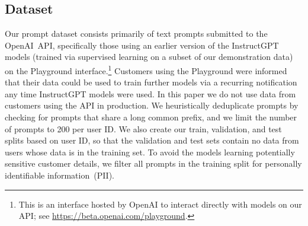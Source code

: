 \documentclass{article}
\begin{document}
\begin{table}
{\begin{tabular}{p{} p{}}
 \bottomrule
 \end{tabular}
}
\end{table}





\subsection{Dataset}
\label{sec:dataset}

Our prompt dataset consists primarily of text prompts submitted to the OpenAI~API, specifically those using an earlier version of the InstructGPT models (trained via supervised learning on a subset of our demonstration data) on the Playground interface.\footnote{This is an interface hosted by OpenAI to interact directly with models on our API; see \url{https://beta.openai.com/playground}.} 
Customers using the Playground were informed that their data could be used to train further models via a recurring notification any time InstructGPT models were used.
In this paper we do not use data from customers using the API in production. We heuristically deduplicate prompts by checking for prompts that share a long common prefix, and we limit the number of prompts to 200 per user ID.  We also create our train, validation, and test splits based on user ID, so that the validation and test sets contain no data from users whose data is in the training set.  To avoid the models learning potentially sensitive customer details, we filter all prompts in the training split for personally identifiable information~(PII).
\end{document}
